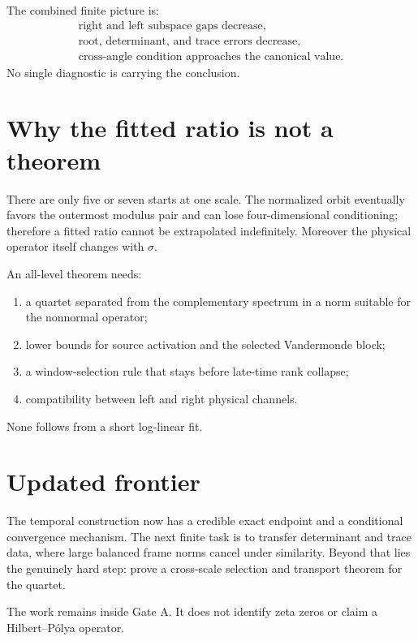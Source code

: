\documentclass[12pt]{article}
\theoremstyle{remark}
\begin{document}
The combined finite picture is:
\begin{equation}\label{eq:combined-picture}
 \begin{gathered}
 \text{right and left subspace gaps decrease},\\
 \text{root, determinant, and trace errors decrease},\\
 \text{cross-angle condition approaches the canonical value}.
 \end{gathered}
\end{equation}
No single diagnostic is carrying the conclusion.

\section{Why the fitted ratio is not a theorem}

There are only five or seven starts at one scale.  The normalized orbit
eventually favors the outermost modulus pair and can lose four-dimensional
conditioning; therefore a fitted ratio cannot be extrapolated indefinitely.
Moreover the physical operator itself changes with $\sigma$.

An all-level theorem needs:
\begin{enumerate}[leftmargin=2em]
\item a quartet separated from the complementary spectrum in a norm suitable
 for the nonnormal operator;
\item lower bounds for source activation and the selected Vandermonde block;
\item a window-selection rule that stays before late-time rank collapse;
\item compatibility between left and right physical channels.
\end{enumerate}
None follows from a short log-linear fit.

\section{Updated frontier}

The temporal construction now has a credible exact endpoint and a
conditional convergence mechanism.  The next finite task is to transfer
determinant and trace data, where large balanced frame norms cancel under
similarity.  Beyond that lies the genuinely hard step: prove a cross-scale
selection and transport theorem for the quartet.

The work remains inside Gate A.  It does not identify zeta zeros or claim a
Hilbert--P\'olya operator.



\end{document}
